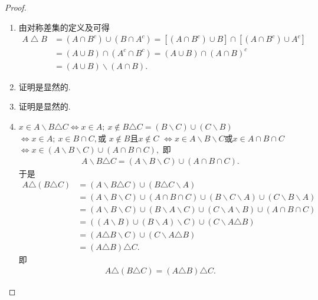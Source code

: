 \documentclass[../../main.tex]{subfiles}%
\begin{document}
\begin{proof}
\begin{enumerate}[(1)]
\item 由对称差集的定义及可得
\begin{align*}
A\bigtriangleup B&=\left( A\cap B^c \right) \cup \left( B\cap A^c \right) =\left[ \left( A\cap B^c \right) \cup B \right] \cap \left[ \left( A\cap B^c \right) \cup A^c \right] 
\\
&=\left( A\cup B \right) \cap \left( A^c\cap B^c \right) =\left( A\cup B \right) \cap \left( A\cap B \right) ^c
\\
&=\left( A\cup B \right) \backslash \left( A\cap B \right) .
\end{align*}

\item 证明是显然的.

\item 证明是显然的.

\item $x\in A \backslash  B\triangle C \Leftrightarrow x\in A;\ x\notin B\triangle C=(B\backslash C)\cup(C\backslash B)$
$\Leftrightarrow x\in A;\ x\in B\cap C,\text{或 } x\notin B \text{且}x\notin C$
$\Leftrightarrow x\in A\backslash B\backslash C \text{或} x\in A\cap B\cap C$
$\Leftrightarrow x\in (A\backslash B\backslash C)\cup(A\cap B\cap C),$
即
\begin{align*}
A \backslash  B\triangle C = (A \backslash  B \backslash  C) \cup (A \cap B \cap C).
\end{align*}
于是
\begin{align*}
A\triangle(B\triangle C) &= (A \backslash  B\triangle C) \cup (B\triangle C \backslash  A) \\
&=(A \backslash  B \backslash  C) \cup (A \cap B \cap C) \cup (B \backslash  C \backslash  A) \cup (C \backslash  B \backslash  A) \\
&=(A \backslash  B \backslash  C) \cup (B \backslash  A \backslash  C) \cup (C \backslash  A \backslash  B) \cup (A \cap B \cap C) \\
&=((A \backslash  B) \cup (B \backslash  A) \backslash  C) \cup (C \backslash  A\triangle B) \\
&=(A\triangle B \backslash  C) \cup (C \backslash  A\triangle B) \\
&=(A\triangle B)\triangle C.
\end{align*}
即
\begin{align*}
A\triangle(B\triangle C) = (A\triangle B)\triangle C.
\end{align*}


\end{enumerate}
\end{proof}
\end{document}
